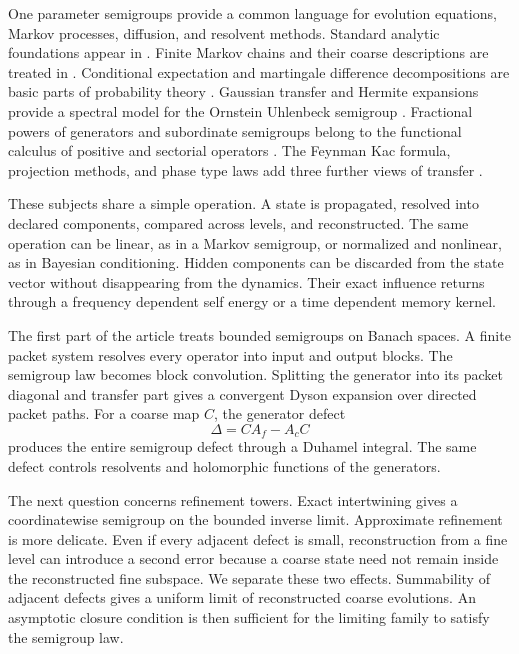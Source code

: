 \documentclass[11pt,a4paper]{article}
\theoremstyle{definition}
\theoremstyle{remark}
\begin{document}
One parameter semigroups provide a common language for evolution equations, Markov processes, diffusion, and resolvent methods. Standard analytic foundations appear in \cite{Pazy1983,EngelNagel2000}. Finite Markov chains and their coarse descriptions are treated in \cite{KemenySnell1960,Norris1997,RogersPitman1981}. Conditional expectation and martingale difference decompositions are basic parts of probability theory \cite{Williams1991}. Gaussian transfer and Hermite expansions provide a spectral model for the Ornstein Uhlenbeck semigroup \cite{Janson1997}. Fractional powers of generators and subordinate semigroups belong to the functional calculus of positive and sectorial operators \cite{Balakrishnan1960,SchillingSongVondracek2012}. The Feynman Kac formula, projection methods, and phase type laws add three further views of transfer \cite{Kac1949,Feshbach1958,Zwanzig1961,Neuts1981}.

These subjects share a simple operation. A state is propagated, resolved into declared components, compared across levels, and reconstructed. The same operation can be linear, as in a Markov semigroup, or normalized and nonlinear, as in Bayesian conditioning. Hidden components can be discarded from the state vector without disappearing from the dynamics. Their exact influence returns through a frequency dependent self energy or a time dependent memory kernel.

The first part of the article treats bounded semigroups on Banach spaces. A finite packet system resolves every operator into input and output blocks. The semigroup law becomes block convolution. Splitting the generator into its packet diagonal and transfer part gives a convergent Dyson expansion over directed packet paths. For a coarse map \(C\), the generator defect
\[
\Delta=CA_f-A_cC
\]
produces the entire semigroup defect through a Duhamel integral. The same defect controls resolvents and holomorphic functions of the generators.

The next question concerns refinement towers. Exact intertwining gives a coordinatewise semigroup on the bounded inverse limit. Approximate refinement is more delicate. Even if every adjacent defect is small, reconstruction from a fine level can introduce a second error because a coarse state need not remain inside the reconstructed fine subspace. We separate these two effects. Summability of adjacent defects gives a uniform limit of reconstructed coarse evolutions. An asymptotic closure condition is then sufficient for the limiting family to satisfy the semigroup law.
\end{document}
